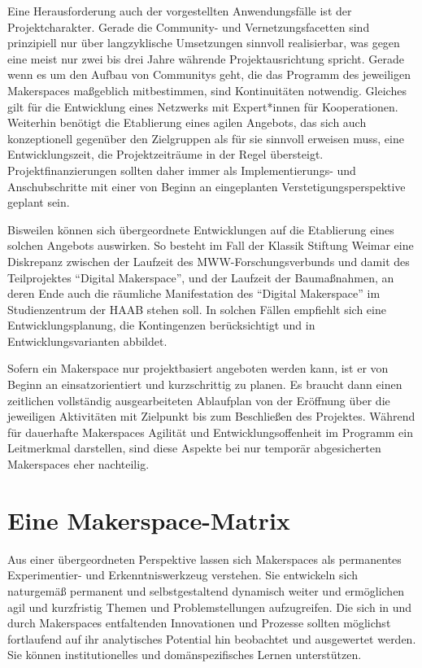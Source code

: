 \documentclass[a4paper,
fontsize=11pt,
oneside,
numbers=noperiodatend,
parskip=half-,
bibliography=totoc,
final
]{scrartcl}
\begin{document}
Eine Herausforderung auch der vorgestellten Anwendungsfälle ist der
Projektcharakter. Gerade die Community- und Vernetzungsfacetten sind
prinzipiell nur über langzyklische Umsetzungen sinnvoll realisierbar,
was gegen eine meist nur zwei bis drei Jahre währende Projektausrichtung
spricht. Gerade wenn es um den Aufbau von Communitys geht, die das
Programm des jeweiligen Makerspaces maßgeblich mitbestimmen, sind
Kontinuitäten notwendig. Gleiches gilt für die Entwicklung eines
Netzwerks mit Expert*innen für Kooperationen. Weiterhin benötigt die
Etablierung eines agilen Angebots, das sich auch konzeptionell gegenüber
den Zielgruppen als für sie sinnvoll erweisen muss, eine
Entwicklungszeit, die Projektzeiträume in der Regel übersteigt.
Projektfinanzierungen sollten daher immer als Implementierungs- und
Anschubschritte mit einer von Beginn an eingeplanten
Verstetigungsperspektive geplant sein.

Bisweilen können sich übergeordnete Entwicklungen auf die Etablierung
eines solchen Angebots auswirken. So besteht im Fall der Klassik
Stiftung Weimar eine Diskrepanz zwischen der Laufzeit des
MWW-Forschungsverbunds und damit des Teilprojektes \enquote{Digital
Makerspace}, und der Laufzeit der Baumaßnahmen, an deren Ende auch die
räumliche Manifestation des \enquote{Digital Makerspace} im
Studienzentrum der HAAB stehen soll. In solchen Fällen empfiehlt sich
eine Entwicklungsplanung, die Kontingenzen berücksichtigt und in
Entwicklungsvarianten abbildet.

Sofern ein Makerspace nur projektbasiert angeboten werden kann, ist er
von Beginn an einsatzorientiert und kurzschrittig zu planen. Es braucht
dann einen zeitlichen vollständig ausgearbeiteten Ablaufplan von der
Eröffnung über die jeweiligen Aktivitäten mit Zielpunkt bis zum
Beschließen des Projektes. Während für dauerhafte Makerspaces Agilität
und Entwicklungsoffenheit im Programm ein Leitmerkmal darstellen, sind
diese Aspekte bei nur temporär abgesicherten Makerspaces eher
nachteilig.

\hypertarget{eine-makerspace-matrix}{%
\section{Eine Makerspace-Matrix}\label{eine-makerspace-matrix}}

Aus einer übergeordneten Perspektive lassen sich Makerspaces als
permanentes Experimentier- und Erkenntniswerkzeug verstehen. Sie
entwickeln sich naturgemäß permanent und selbstgestaltend dynamisch
weiter und ermöglichen agil und kurzfristig Themen und Problemstellungen
aufzugreifen. Die sich in und durch Makerspaces entfaltenden
Innovationen und Prozesse sollten möglichst fortlaufend auf ihr
analytisches Potential hin beobachtet und ausgewertet werden. Sie können
institutionelles und domänspezifisches Lernen unterstützen.
\end{document}
